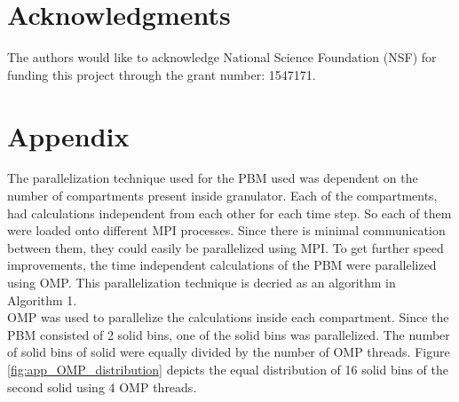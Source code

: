\documentclass[preprint,11pt,authoryear]{elsarticle}
\begin{document}
\section{Acknowledgments}
The authors would like to acknowledge National Science Foundation (NSF) for 
funding this project
through the grant number: 1547171.
\section*{Appendix}
The parallelization technique used for the PBM used was dependent on the number of compartments present inside 
granulator. Each of the compartments, had calculations independent from each other for each time step. So each of them were
loaded onto different MPI processes. Since there is minimal communication between them, they could easily be parallelized using MPI. 
To get further speed improvements, the time independent calculations of the PBM were parallelized using OMP. 
This parallelization technique is decried as an algorithm in Algorithm 1. \\
OMP was used to parallelize the calculations inside each compartment. Since the PBM consisted of 2 solid bins, one of 
the solid bins was parallelized. The number of solid bins of solid were equally divided by the number of OMP threads. 
Figure \ref{fig:app_OMP_distribution} depicts the equal distribution of 16 solid bins of the second solid using 4 OMP 
threads.
\end{document}
